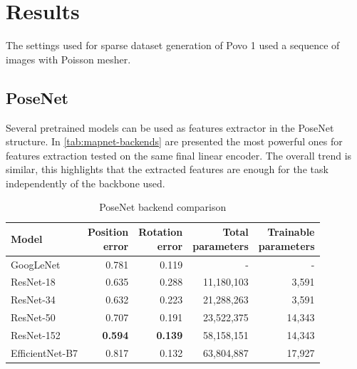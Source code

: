 \section{Results}
The settings used for sparse dataset generation of Povo 1 used a sequence of images with Poisson mesher.

\subsection{PoseNet}
Several pretrained models can be used as features extractor in the PoseNet structure. In \cref{tab:mapnet-backends} are presented the most powerful ones for features extraction tested on the same final linear encoder. The overall trend is similar, this highlights that the extracted features are enough for the task independently of the backbone used.
\begin{table}[htbp]
    \caption{PoseNet backend comparison}
    \begin{center}
        \begin{tabular}{lrrrr}
            \toprule
            {Model}         & \thead{Position                                        \\error} & \thead{Rotation\\error} & \thead{Total\\parameters} & \thead{Trainable\\parameters} \\
            \midrule
            GoogLeNet       & 0.781           & 0.119          & -          & -      \\
            ResNet-18       & 0.635           & 0.288          & 11,180,103 & 3,591  \\
            ResNet-34       & 0.632           & 0.223          & 21,288,263 & 3,591  \\
            ResNet-50       & 0.707           & 0.191          & 23,522,375 & 14,343 \\
            ResNet-152      & \textbf{0.594}  & \textbf{0.139} & 58,158,151 & 14,343 \\
            EfficientNet-B7 & 0.817           & 0.132          & 63,804,887 & 17,927 \\
            \bottomrule
        \end{tabular}
        \label{tab:posenet-backends}
    \end{center}
\end{table}


